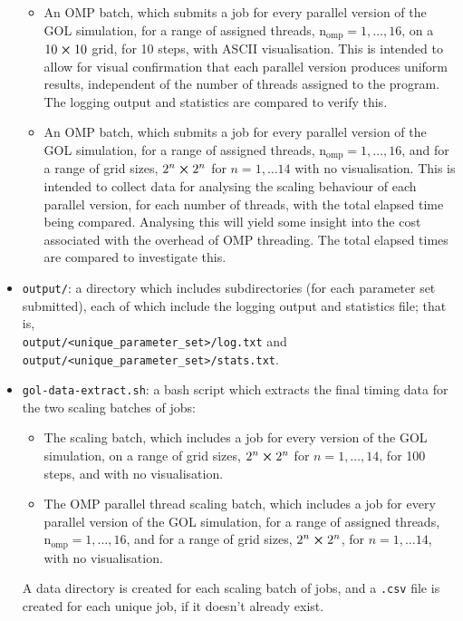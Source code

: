 \documentclass[]{article}
\begin{document}
\begin{itemize}
\begin{itemize}
  \item An OMP batch, which submits a job for every parallel version of the GOL
    simulation, for a range of assigned threads,
    $\mathrm{n_{omp}} = 1, \dotsc, 16$, on a $10\cross10$ grid, for 10 steps,
    with ASCII visualisation.
    This is intended to allow for visual confirmation that each parallel version
    produces uniform results, independent of the number of threads assigned to
    the program.
    The logging output and statistics are compared to verify this.

  \item An OMP batch, which submits a job for every parallel version of the GOL
    simulation, for a range of assigned threads,
    $\mathrm{n_{omp}} = 1, \dotsc, 16$, and for a range of grid sizes,
    $2^{n} \cross 2^{n}$ for $n = 1, \dotsc 14$ with no visualisation.
    This is intended to collect data for analysing the scaling behaviour of each
    parallel version, for each number of threads, with the total elapsed time
    being compared.
    Analysing this will yield some insight into the cost associated with the
    overhead of OMP threading.
    The total elapsed times are compared to investigate this.

  \end{itemize}

\item \lstinline[style=ff]{output/}: a directory which includes subdirectories
  (for each parameter set submitted), each of which include the logging output
  and statistics file; that is, \\
  \lstinline[style=ff]{output/<unique_parameter_set>/log.txt} and \\
  \lstinline[style=ff]{output/<unique_parameter_set>/stats.txt}.

\item \lstinline[style=ff]{gol-data-extract.sh}: a bash script which extracts
  the final timing data for the two scaling batches of jobs:
  \begin{itemize}
  \item The scaling batch, which includes a job for every version of the GOL
    simulation, on a range of grid sizes, $2^{n} \cross 2^{n}$ for
    $n = 1, \dotsc, 14$, for 100 steps, and with no visualisation.

  \item The OMP parallel thread scaling batch, which includes a job for every
    parallel version of the GOL simulation, for a range of assigned threads,
    $\mathrm{n_{omp}} = 1, \dotsc, 16$, and for a range of grid sizes,
    $2^{n} \cross 2^{n}$, for $n = 1, \dotsc 14$, with no visualisation.
  \end{itemize}
  A data directory is created for each scaling batch of jobs, and a
  \lstinline[style=ff]{.csv} file is created for each unique job, if it doesn't
  already exist.


\end{itemize}
\end{document}
